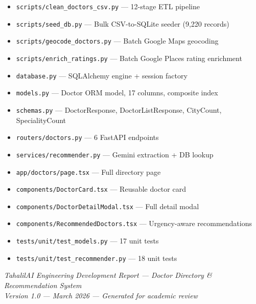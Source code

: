 \documentclass[12pt, a4paper]{article}
\newcommand{\file}[1]{\texttt{\color{accent}#1}}
\begin{document}
\begin{successbox}[title={Deliverables Completed}]
  \begin{itemize}[leftmargin=*, itemsep=3pt, topsep=0pt]
    \item[\checkmark] \file{scripts/clean\_doctors\_csv.py} — 12-stage ETL pipeline
    \item[\checkmark] \file{scripts/seed\_db.py} — Bulk CSV-to-SQLite seeder (9,220 records)
    \item[\checkmark] \file{scripts/geocode\_doctors.py} — Batch Google Maps geocoding
    \item[\checkmark] \file{scripts/enrich\_ratings.py} — Batch Google Places rating enrichment
    \item[\checkmark] \file{database.py} — SQLAlchemy engine + session factory
    \item[\checkmark] \file{models.py} — Doctor ORM model, 17 columns, composite index
    \item[\checkmark] \file{schemas.py} — DoctorResponse, DoctorListResponse, CityCount, SpecialityCount
    \item[\checkmark] \file{routers/doctors.py} — 6 FastAPI endpoints
    \item[\checkmark] \file{services/recommender.py} — Gemini extraction + DB lookup
    \item[\checkmark] \file{app/doctors/page.tsx} — Full directory page
    \item[\checkmark] \file{components/DoctorCard.tsx} — Reusable doctor card
    \item[\checkmark] \file{components/DoctorDetailModal.tsx} — Full detail modal
    \item[\checkmark] \file{components/RecommendedDoctors.tsx} — Urgency-aware recommendations
    \item[\checkmark] \file{tests/unit/test\_models.py} — 17 unit tests
    \item[\checkmark] \file{tests/unit/test\_recommender.py} — 18 unit tests
  \end{itemize}
\end{successbox}

\vspace{1cm}
\begin{center}
  \color{midgray}\small
  \textit{TahalilAI Engineering Development Report — Doctor Directory \& Recommendation System}\\
  \textit{Version 1.0 — March 2026 — Generated for academic review}
\end{center}
\end{document}
